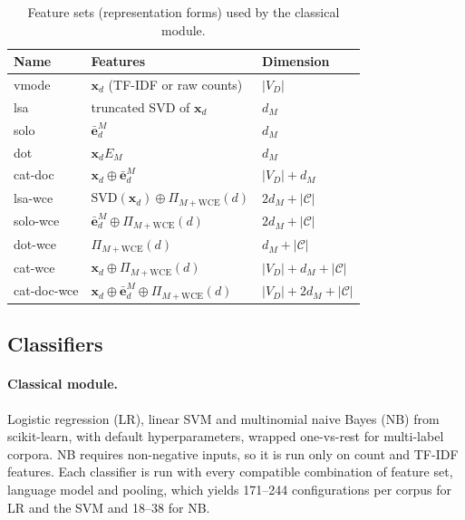 \documentclass{ijis}
\begin{document}
\begin{table}[t]
\centering
\footnotesize
\caption{Feature sets (representation forms) used by the classical module.}
\label{tab:forms}
\begin{tabular}{@{}lll@{}}
\toprule
\textbf{Name} & \textbf{Features} & \textbf{Dimension} \\
\midrule
vmode & $\mathbf{x}_d$ (TF-IDF or raw counts) & $|V_D|$ \\
lsa & truncated SVD of $\mathbf{x}_d$ & $d_M$ \\
solo & $\bar{\mathbf{e}}^{M}_d$ & $d_M$ \\
dot & $\mathbf{x}_d E_M$ & $d_M$ \\
cat-doc & $\mathbf{x}_d \oplus \bar{\mathbf{e}}^{M}_d$ & $|V_D| + d_M$ \\
\midrule
lsa-wce & $\mathrm{SVD}(\mathbf{x}_d) \oplus \Pi_{M+\mathrm{WCE}}(d)$ & $2d_M + |\mathcal{C}|$ \\
solo-wce & $\bar{\mathbf{e}}^{M}_d \oplus \Pi_{M+\mathrm{WCE}}(d)$ & $2d_M + |\mathcal{C}|$ \\
dot-wce & $\Pi_{M+\mathrm{WCE}}(d)$ & $d_M + |\mathcal{C}|$ \\
cat-wce & $\mathbf{x}_d \oplus \Pi_{M+\mathrm{WCE}}(d)$ & $|V_D| + d_M + |\mathcal{C}|$ \\
cat-doc-wce & $\mathbf{x}_d \oplus \bar{\mathbf{e}}^{M}_d \oplus \Pi_{M+\mathrm{WCE}}(d)$ & $|V_D| + 2d_M + |\mathcal{C}|$ \\
\bottomrule
\end{tabular}
\end{table}

\subsection{Classifiers}

\paragraph{Classical module.} Logistic regression (LR), linear SVM and multinomial naive Bayes (NB) from scikit-learn, with default hyperparameters, wrapped one-vs-rest for multi-label corpora. NB requires non-negative inputs, so it is run only on count and TF-IDF features. Each classifier is run with every compatible combination of feature set, language model and pooling, which yields 171--244 configurations per corpus for LR and the SVM and 18--38 for NB.
\end{document}
